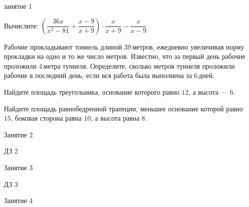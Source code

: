 %

\begin{class}[number=1]
	\begin{listofex}
		\item занятие 1
	\end{listofex}
\end{class}

\begin{homework}[number=1]
	\begin{listofex}
		\item Вычислите: \quad \(\left( \dfrac{36x}{x^2-81}+\dfrac{x-9}{x+9} \right)\cdot\dfrac{x}{x+9}-\dfrac{x}{x-9}\)
		\item Рабочие прокладывают тоннель длиной \( 39 \) метров, ежедневно увеличивая норму прокладки на одно и то же число метров. Известно, что за первый день рабочие проложили \( 4 \) метра туннеля. Определите, сколько метров туннеля проложили рабочие в последний день, если вся работа была выполнена за \( 6 \) дней.
		\item Найдите площадь треугольника, основание которого равно \( 12 \), а высота --- \( 6 \).
		\item Найдите площадь равнобедренной трапеции, меньшее основание которой равно \( 15 \), боковая сторона равна \( 10 \), а высота равна \( 8 \).
	\end{listofex}
\end{homework}

\begin{class}[number=2]
	\begin{listofex}
		\item Занятие 2
	\end{listofex}
\end{class}

\begin{homework}[number=2]
	\begin{listofex}
		\item ДЗ 2
	\end{listofex}
\end{homework}

\begin{class}[number=3]
	\begin{listofex}
		\item Занятие 3
	\end{listofex}
\end{class}

\begin{homework}[number=3]
	\begin{listofex}
		\item ДЗ 3
	\end{listofex}
\end{homework}

\begin{class}[number=4]
	\begin{listofex}
		\item Занятие 4
	\end{listofex}
\end{class}
